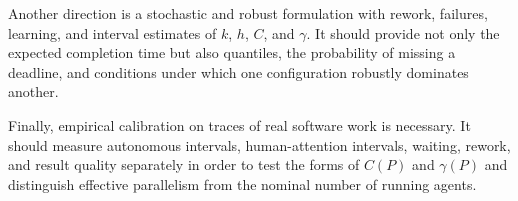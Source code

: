 Another direction is a stochastic and robust formulation with rework,
failures, learning, and interval estimates of $k$, $h$, $C$, and $\gamma$. It
should provide not only the expected completion time but also quantiles, the
probability of missing a deadline, and conditions under which one
configuration robustly dominates another.

Finally, empirical calibration on traces of real software work is necessary.
It should measure autonomous intervals, human-attention intervals, waiting,
rework, and result quality separately in order to test the forms of $C(P)$ and
$\gamma(P)$ and distinguish effective parallelism from the nominal number of
running agents.
